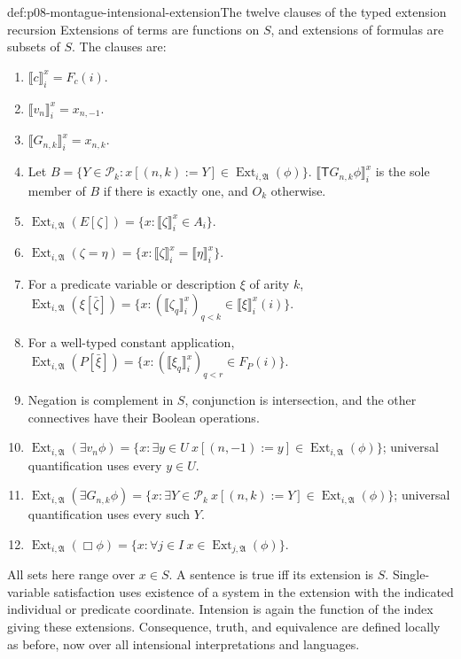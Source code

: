 \begin{hbdefinition}{def:p08-montague-intensional-extension}{The twelve clauses of the typed extension recursion}
Extensions of terms are functions on \(S\), and extensions of formulas
are subsets of \(S\). The clauses are:
\begin{enumerate}
\item \(\llbracket c\rrbracket_i^x=F_c(i)\).
\item \(\llbracket v_n\rrbracket_i^x=x_{n,-1}\).
\item \(\llbracket G_{n,k}\rrbracket_i^x=x_{n,k}\).
\item Let \(B=\{Y\in\mathcal P_k:x[(n,k):=Y]\in
      \operatorname{Ext}_{i,\mathfrak A}(\phi)\}\).
      \(\llbracket\mathsf T G_{n,k}\phi\rrbracket_i^x\) is the sole
      member of \(B\) if there is exactly one, and \(O_k\) otherwise.
\item \(\operatorname{Ext}_{i,\mathfrak A}(E[\zeta])
      =\{x:\llbracket\zeta\rrbracket_i^x\in A_i\}\).
\item \(\operatorname{Ext}_{i,\mathfrak A}(\zeta=\eta)
      =\{x:\llbracket\zeta\rrbracket_i^x=\llbracket\eta\rrbracket_i^x\}\).
\item For a predicate variable or description \(\xi\) of arity \(k\),
      \(\operatorname{Ext}_{i,\mathfrak A}(\xi[\bar\zeta])
      =\{x:(\llbracket\zeta_q\rrbracket_i^x)_{q<k}
                         \in\llbracket\xi\rrbracket_i^x(i)\}\).
\item For a well-typed constant application,
      \(\operatorname{Ext}_{i,\mathfrak A}(P[\bar\xi])
      =\{x:(\llbracket\xi_q\rrbracket_i^x)_{q<r}\in F_P(i)\}\).
\item Negation is complement in \(S\), conjunction is intersection,
      and the other connectives have their Boolean operations.
\item \(\operatorname{Ext}_{i,\mathfrak A}(\exists v_n\phi)
      =\{x:\exists y\in U\ x[(n,-1):=y]\in
                      \operatorname{Ext}_{i,\mathfrak A}(\phi)\}\);
      universal quantification uses every \(y\in U\).
\item \(\operatorname{Ext}_{i,\mathfrak A}(\exists G_{n,k}\phi)
      =\{x:\exists Y\in\mathcal P_k\ x[(n,k):=Y]\in
                      \operatorname{Ext}_{i,\mathfrak A}(\phi)\}\);
      universal quantification uses every such \(Y\).
\item \(\operatorname{Ext}_{i,\mathfrak A}(\Box\phi)
      =\{x:\forall j\in I\ x\in\operatorname{Ext}_{j,\mathfrak A}(\phi)\}\).
\end{enumerate}
All sets here range over \(x\in S\). A sentence is true iff its extension
is \(S\). Single-variable satisfaction uses existence of a system in the
extension with the indicated individual or predicate coordinate. Intension
is again the function of the index giving these extensions. Consequence,
truth, and equivalence are defined locally as before, now over all
intensional interpretations and languages.
\end{hbdefinition}

